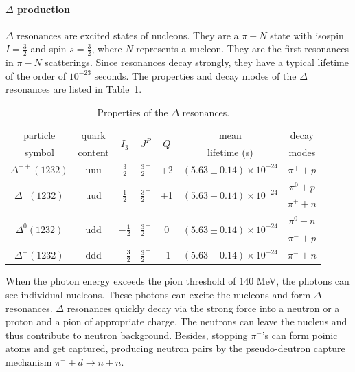 \paragraph{$\Delta$ production}
$\Delta$ resonances are excited states of nucleons. They are a $\pi-N$ state with isospin $I=\frac{3}{2}$ and spin $s=\frac{3}{2}$, where $N$ represents a nucleon. They are the first resonances in $\pi-N$ scatterings. Since resonances decay strongly, they have a typical lifetime of the order of $10^{-23}$ seconds. The properties and decay modes of the $\Delta$ resonances are listed in Table~\ref{table:Delta_resonances}.
\begin{table}
	\centering
	\begin{tabular}{|c|c|c|c|c|c|c|}
	\hline
	particle & quark & \multirow{2}{*}{$I_3$} & \multirow{2}{*}{$J^P$} & \multirow{2}{*}{$Q$} & mean & decay \\
	symbol & content & & & & lifetime (s) & modes \\
	\hline
	$\Delta^{++}(1232)$ & uuu & $\frac{3}{2}$ & $\frac{3}{2}^+$ & +2 & $(5.63\pm 0.14)\times 10^{-24}$ & $\pi^++p$ \\
	\hline
	\multirow{2}{*}{$\Delta^{+}(1232)$} & \multirow{2}{*}{uud} & \multirow{2}{*}{$\frac{1}{2}$} & \multirow{2}{*}{$\frac{3}{2}^+$} & \multirow{2}{*}{+1} & \multirow{2}{*}{$(5.63\pm 0.14)\times 10^{-24}$} & $\pi^0+p$ \\
	& & & & & & $\pi^++n$ \\
	\hline
	\multirow{2}{*}{$\Delta^{0}(1232)$} & \multirow{2}{*}{udd} & \multirow{2}{*}{$-\frac{1}{2}$} & \multirow{2}{*}{$\frac{3}{2}^+$} & \multirow{2}{*}{0} & \multirow{2}{*}{$(5.63\pm 0.14)\times 10^{-24}$} & $\pi^0+n$ \\
	& & & & & & $\pi^-+p$ \\
	\hline
	$\Delta^{-}(1232)$ & ddd & $-\frac{3}{2}$ & $\frac{3}{2}^+$ & -1 & $(5.63\pm 0.14)\times 10^{-24}$ & $\pi^-+n$ \\
	\hline
	\end{tabular}
	\caption{Properties of the $\Delta$ resonances.}
	\label{table:Delta_resonances}
\end{table}
When the photon energy exceeds the pion threshold of 140 MeV, the photons can see individual nucleons. These photons can excite the nucleons and form $\Delta$ resonances. $\Delta$ resonances quickly decay via the strong force into a neutron or a proton and a pion of appropriate charge. The neutrons can leave the nucleus and thus contribute to neutron background. Besides, stopping $\pi^-$'s can form poinic atoms and get captured, producing neutron pairs by the pseudo-deutron capture mechanism $\pi^-+d\rightarrow n+n$.

